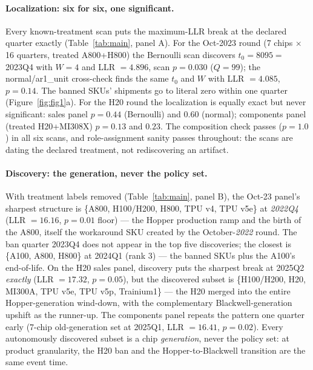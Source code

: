 \documentclass[11pt]{article}
\begin{document}
\paragraph{Localization: six for six, one significant.} Every known-treatment
scan puts the maximum-LLR break at the declared quarter exactly
(Table~\ref{tab:main}, panel A). For the Oct-2023 round (7 chips $\times$ 16
quarters, treated A800+H800) the Bernoulli scan discovers $t_0=8095=$ 2023Q4
with $W=4$ and LLR $=4.896$, scan $p=0.030$ ($Q=99$); the normal/ar1\_unit
cross-check finds the same $t_0$ and $W$ with LLR $=4.085$, $p=0.14$. The
banned SKUs' shipments go to literal zero within one quarter
(Figure~\ref{fig:fig1}a). For the H20 round the localization is equally
exact but never significant: sales panel $p=0.44$ (Bernoulli) and $0.60$
(normal); components panel (treated H20+MI308X) $p=0.13$ and $0.23$. The
composition check passes ($p=1.0$) in all six scans, and role-assignment
sanity passes throughout: the scans are dating the declared treatment, not
rediscovering an artifact.

\paragraph{Discovery: the generation, never the policy set.} With treatment
labels removed (Table~\ref{tab:main}, panel B), the Oct-23 panel's sharpest
structure is \{A800, H100/H200, H800, TPU v4, TPU v5e\} at \emph{2022Q4}
(LLR $=16.16$, $p=0.01$ floor) --- the Hopper production ramp and the birth
of the A800, itself the workaround SKU created by the October-\emph{2022}
round. The ban quarter 2023Q4 does not appear in the top five discoveries;
the closest is \{A100, A800, H800\} at 2024Q1 (rank 3) --- the banned SKUs
plus the A100's end-of-life. On the H20 sales panel, discovery puts the
sharpest break at 2025Q2 \emph{exactly} (LLR $=17.32$, $p=0.05$), but the
discovered subset is \{H100/H200, H20, MI300A, TPU v5e, TPU v5p, Trainium1\}
--- the H20 merged into the entire Hopper-generation wind-down, with the
complementary Blackwell-generation upshift as the runner-up. The components
panel repeats the pattern one quarter early (7-chip old-generation set at
2025Q1, LLR $=16.41$, $p=0.02$). Every autonomously discovered subset is a
chip \emph{generation}, never the policy set: at product granularity, the
H20 ban and the Hopper-to-Blackwell transition are the same event time.
\end{document}
